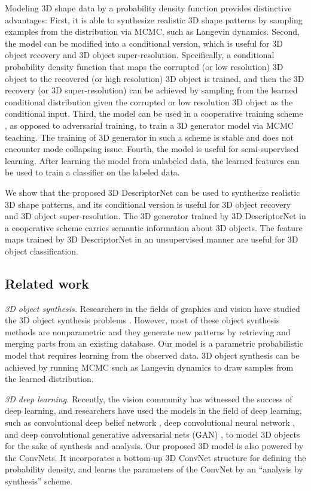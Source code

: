 \documentclass[10pt,twocolumn,letterpaper]{article}
\begin{document}
Modeling 3D shape data by a probability density function provides distinctive advantages: First, it is able to synthesize realistic 3D shape patterns by sampling examples from the distribution via MCMC, such as Langevin dynamics. Second, the model can be modified into a conditional version, which is useful for 3D object recovery and 3D object super-resolution. Specifically, a conditional probability density function that maps the corrupted (or low resolution) 3D object to the recovered (or high resolution) 3D object is trained, and then the 3D recovery (or 3D super-resolution) can be achieved by sampling from the learned conditional distribution given the corrupted or low resolution 3D object as the conditional input. Third, the model can be used in a cooperative training scheme \cite{xie2016cooperative}, as opposed to adversarial training, to train a 3D generator model via MCMC teaching. The training of 3D generator in such a scheme is stable and does not encounter mode collapsing issue. Fourth, the model is useful for semi-supervised learning. After learning the model from unlabeled data, the learned features can be used to train a classifier on the labeled data. 

We show that the proposed 3D DescriptorNet can be used to synthesize realistic 3D shape patterns, and its conditional version is useful for 3D object recovery and 3D object super-resolution. The 3D generator trained by 3D DescriptorNet in a cooperative scheme carries semantic information about 3D objects. The feature maps trained by 3D DescriptorNet in an unsupervised manner are useful for 3D object classification.   

\subsection{Related work}

\textit{3D object synthesis.} Researchers in the fields of graphics and vision have studied the 3D object synthesis problems \cite{blanz1999morphable, carlson1982algorithm, kalogerakis2012probabilistic}. However, most of these object synthesis methods are nonparametric and they generate new patterns by retrieving and merging parts from an existing database. Our model is a parametric probabilistic model that requires learning from the observed data.  3D object synthesis can be achieved by running MCMC such as Langevin dynamics to draw samples from the learned distribution.

\textit{3D deep learning.} Recently, the vision community has witnessed the success of deep learning, and  researchers have used  the models in the field of deep learning, such as convolutional deep belief network \cite{wu20153d}, deep convolutional neural network \cite{maturana2015voxnet}, and deep convolutional generative adversarial nets (GAN) \cite{3dgan}, to model 3D objects for the sake of synthesis and analysis. Our proposed 3D model is also powered by the ConvNets. It incorporates a bottom-up 3D ConvNet structure for defining the probability density, and learns the parameters of the ConvNet by an ``analysis by synthesis'' scheme.   
\end{document}
